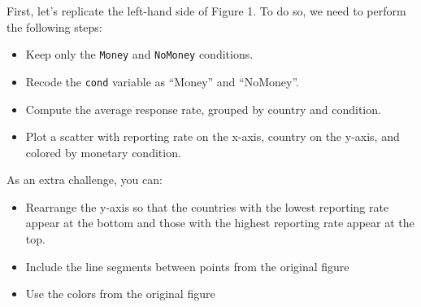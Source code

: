 \documentclass[12pt,halfline,a4paper,]{ouparticle}
\newenvironment{Shaded}{\begin{snugshade}}{\end{snugshade}}
\newcommand{\CommentTok}[1]{\textcolor[rgb]{0.56,0.35,0.01}{\textit{#1}}}
\newcommand{\DataTypeTok}[1]{\textcolor[rgb]{0.13,0.29,0.53}{#1}}
\newcommand{\DecValTok}[1]{\textcolor[rgb]{0.00,0.00,0.81}{#1}}
\newcommand{\KeywordTok}[1]{\textcolor[rgb]{0.13,0.29,0.53}{\textbf{#1}}}
\newcommand{\NormalTok}[1]{#1}
\newcommand{\OperatorTok}[1]{\textcolor[rgb]{0.81,0.36,0.00}{\textbf{#1}}}
\newcommand{\StringTok}[1]{\textcolor[rgb]{0.31,0.60,0.02}{#1}}
\providecommand{\tightlist}{%
  \setlength{\itemsep}{0pt}\setlength{\parskip}{0pt}}
\begin{document}
First, let's replicate the left-hand side of Figure 1. To do so, we need
to perform the following steps:

\begin{itemize}
\tightlist
\item
  Keep only the \texttt{Money} and \texttt{NoMoney} conditions.
\item
  Recode the \texttt{cond} variable as ``Money'' and ``NoMoney''.
\item
  Compute the average response rate, grouped by country and condition.
\item
  Plot a scatter with reporting rate on the x-axis, country on the
  y-axis, and colored by monetary condition.
\end{itemize}

As an extra challenge, you can:

\begin{itemize}
\tightlist
\item
  Rearrange the y-axis so that the countries with the lowest reporting
  rate appear at the bottom and those with the highest reporting rate
  appear at the top.
\item
  Include the line segments between points from the original figure
\item
  Use the colors from the original figure
\end{itemize}

\begin{Shaded}
\end{Shaded}
\end{document}
